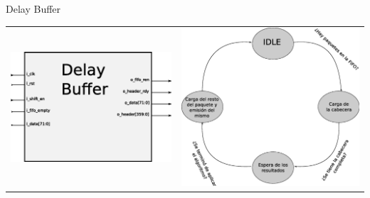 \documentclass[xcolor=dvipsnames]{beamer}
\begin{document}
\begin{frame}{Delay Buffer}
\begin{block}
\begin{itemize}
	   \end{itemize}
 \begin{tabularx}{\linewidth}{Z|Z}
    \includegraphics[scale=0.35]{figures/bloqdelaybuffer.eps} 
    &
    \includegraphics[scale=0.20]{figures/estdelay.eps}
    \\
  \end{tabularx}
\end{block}

\end{frame}
\end{document}
